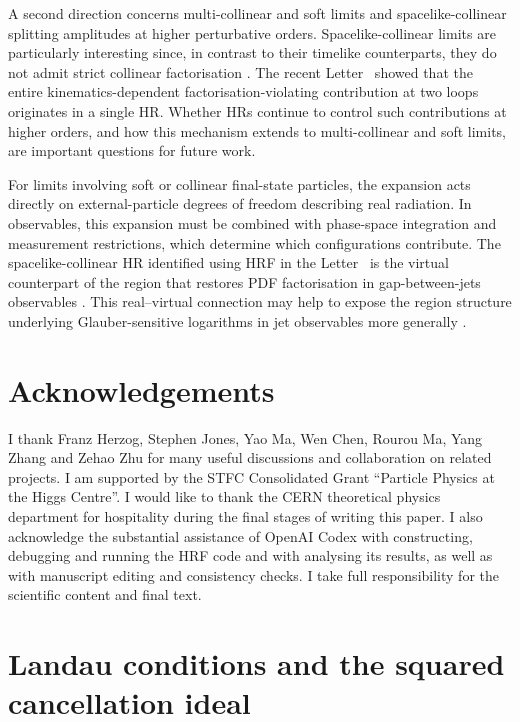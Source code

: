 \documentclass[a4paper,11pt]{article}
\begin{document}
A second direction concerns multi-collinear and soft limits and
spacelike-collinear splitting amplitudes at higher perturbative orders.
Spacelike-collinear limits are particularly interesting since, in contrast to
their timelike counterparts, they do not admit strict collinear factorisation
\cite{Catani:2011st,Dixon:2019lnw,Henn:2024qjq,Buccioni:2026mfg}.  The recent
Letter~\cite{Chen:2026dnj} showed that the entire kinematics-dependent
factorisation-violating contribution at two loops originates in a single HR.
Whether HRs continue to control such contributions at higher orders, and how
this mechanism extends to multi-collinear and soft limits, are important
questions for future work.

For limits involving soft or collinear final-state particles, the expansion
acts directly on external-particle degrees of freedom describing real
radiation.  In observables, this expansion must be combined with phase-space
integration and measurement restrictions, which determine which
configurations contribute.  The spacelike-collinear HR identified using HRF
in the Letter~\cite{Chen:2026dnj} is the virtual counterpart of the region that
restores PDF factorisation in gap-between-jets observables
\cite{Becher:2024kmk,Becher:2025igg,Becher:2026kbr}.  This real--virtual
connection may help to expose the region structure underlying Glauber-sensitive
logarithms in jet observables more generally
\cite{Dasgupta:2025cgl,Banfi:2025mra}.

\section*{Acknowledgements}

I thank Franz Herzog, Stephen Jones, Yao Ma,  Wen Chen, Rourou Ma, Yang Zhang and
Zehao Zhu for many useful discussions and  collaboration on related projects. I am supported by the STFC Consolidated Grant
``Particle Physics at the Higgs Centre''. I would like to thank the CERN theoretical physics department for hospitality during the final stages of writing this paper. I also acknowledge the substantial
assistance of OpenAI Codex with constructing, debugging and running the HRF
code and with analysing its results, as well as with manuscript editing and
consistency checks. I take full responsibility for the scientific content and final text.

\appendix
\begingroup
\raggedbottom
\section{Landau conditions and the squared cancellation ideal}
\label{app:squared-ideal}
\end{document}
